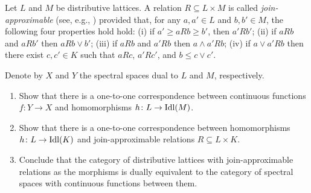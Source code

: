 \begin{exercise}\label{exer:join-approx}
Let $L$ and $M$ be distributive lattices. A relation $R\subseteq L\times M$ is called \emph{join-approximable} (see, e.g., \cite[Definition~7.2.24]{AbJu94}) provided that, for any $a, a' \in L$ and $b, b' \in M$, the following four properties hold hold: (i) if $a' \geq a {R} b \geq b'$, then $a' {R} b'$; (ii) if $aRb$ and $aRb'$ then $a{R}b \vee b'$; (iii) if $a{R}b$ and $a'{R}b$ then $a \wedge a'{R} b$; (iv) if $a \vee a' {R} b$ then there exist $c, c' \in K$ such that $a{R}c$, $a'{R}c'$, and $b \leq c \vee c'$.

Denote by $X$ and $Y$ the spectral spaces dual to $L$ and $M$, respectively.
\begin{enumerate}
\item Show that there is a one-to-one correspondence between continuous functions $f\colon Y\to X$ and {\DL} homomorphisms $h\colon L\to \mathrm{Idl}(M)$.

\item Show that there is a one-to-one correspondence between {\DL} homomorphisms $h\colon L\to \mathrm{Idl}(K)$ and join-approximable relations $R\subseteq L\times K$.
\item Conclude that the category of distributive lattices with join-approximable relations as the morphisms is dually equivalent to the category of spectral spaces with continuous functions between them. 
\end{enumerate}
\end{exercise}





\theendnotes
\setcounter{endnote}{0}

